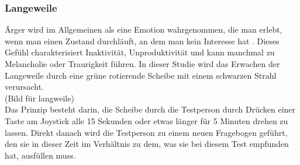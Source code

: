\subsubsection{Langeweile} \label{langeweile-1}


Ärger wird im Allgemeinen als eine Emotion wahrgenommen, die man erlebt, wenn man einen Zustand durchläuft, an dem man kein Interesse hat \cite{vodanovich_2003}. Dieses Gefühl charakterisiert Inaktivität, Unproduktivität und kann manchmal zu Melancholie oder Traurigkeit führen.
In dieser Studie wird das Erwachen der Langeweile durch eine grüne rotierende Scheibe mit einem schwarzen Strahl verursacht. \\

(Bild für langweile)\\

 Das Prinzip besteht darin, die Scheibe durch die Testperson durch Drücken einer Taste am Joystick alle 15 Sekunden oder etwas länger für 5 Minuten drehen zu lassen. Direkt danach wird die Testperson zu einem neuen Fragebogen geführt, den sie in dieser Zeit im Verhältnis zu dem, was sie bei diesem Test empfunden hat, ausfüllen muss.